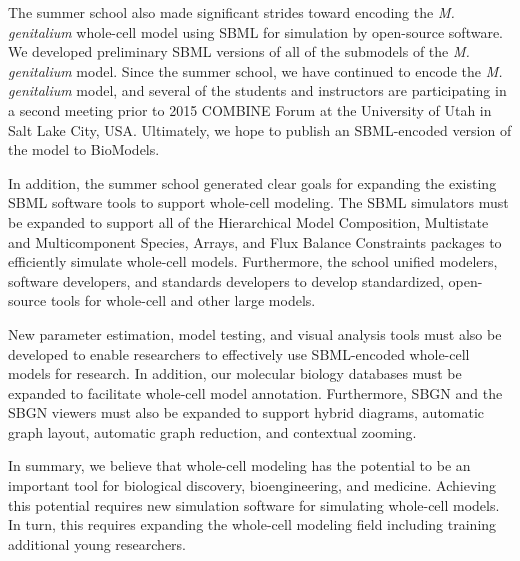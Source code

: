 \documentclass[journal,transmag]{IEEEtran}
\begin{document}
The summer school also made significant strides toward encoding the \textit{M. genitalium} whole-cell model using SBML for simulation by open-source software. We developed preliminary SBML versions of all of the submodels of the \textit{M. genitalium} model. Since the summer school, we have continued to encode the \textit{M. genitalium} model, and several of the students and instructors are participating in a second meeting prior to 2015 COMBINE Forum at the University of Utah in Salt Lake City, USA. Ultimately, we hope to publish an SBML-encoded version of the model to BioModels. 

In addition, the summer school generated clear goals for expanding the existing SBML software tools to support whole-cell modeling. The SBML simulators must be expanded to support all of the Hierarchical Model Composition, Multistate and Multicomponent Species, Arrays, and Flux Balance Constraints packages to efficiently simulate whole-cell models. Furthermore, the school unified modelers, software developers, and standards developers to develop standardized, open-source tools for whole-cell and other large models.

New parameter estimation, model testing, and visual analysis tools must also be developed to enable researchers to effectively use SBML-encoded whole-cell models for research. In addition, our molecular biology databases must be expanded to facilitate whole-cell model annotation. Furthermore, SBGN and the SBGN viewers must also be expanded to support hybrid diagrams, automatic graph layout, automatic graph reduction, and contextual zooming.

In summary, we believe that whole-cell modeling has the potential to be an important tool for biological discovery, bioengineering, and medicine. Achieving this potential requires new simulation software for simulating whole-cell models. In turn, this requires expanding the whole-cell modeling field including training additional young researchers.

\ifCLASSOPTIONcaptionsoff
  \newpage
\fi




% 
\end{document}

